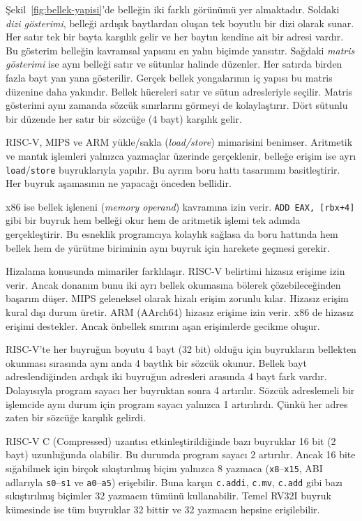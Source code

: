 Şekil~\ref{fig:bellek-yapisi}'de belleğin iki farklı görünümü yer almaktadır. Soldaki \emph{dizi gösterimi}, belleği ardışık baytlardan oluşan tek boyutlu bir dizi olarak sunar. Her satır tek bir bayta karşılık gelir ve her baytın kendine ait bir adresi vardır. Bu gösterim belleğin kavramsal yapısını en yalın biçimde yansıtır. Sağdaki \emph{matris gösterimi} ise aynı belleği satır ve sütunlar halinde düzenler. Her satırda birden fazla bayt yan yana gösterilir. Gerçek bellek yongalarının iç yapısı bu matris düzenine daha yakındır. Bellek hücreleri satır ve sütun adresleriyle seçilir. Matris gösterimi aynı zamanda sözcük sınırlarını görmeyi de kolaylaştırır. Dört sütunlu bir düzende her satır bir sözcüğe (4 bayt) karşılık gelir.

\begin{karsilastirma}
RISC-V, MIPS ve ARM yükle/sakla (\emph{load/store}) mimarisini benimser. Aritmetik ve mantık işlemleri yalnızca yazmaçlar üzerinde gerçeklenir, belleğe erişim ise ayrı \texttt{load}/\texttt{store} buyruklarıyla yapılır. Bu ayrım boru hattı tasarımını basitleştirir. Her buyruk aşamasının ne yapacağı önceden bellidir.

x86 ise bellek işleneni (\emph{memory operand}) kavramına izin verir. \texttt{ADD EAX, [rbx+4]} gibi bir buyruk hem belleği okur hem de aritmetik işlemi tek adımda gerçekleştirir. Bu esneklik programcıya kolaylık sağlasa da boru hattında hem bellek hem de yürütme biriminin aynı buyruk için harekete geçmesi gerekir.

Hizalama konusunda mimariler farklılaşır. RISC-V belirtimi hizasız erişime izin verir. Ancak donanım bunu iki ayrı bellek okumasına bölerek çözebileceğinden başarım düşer. MIPS geleneksel olarak hizalı erişim zorunlu kılar. Hizasız erişim kural dışı durum üretir. ARM (AArch64) hizasız erişime izin verir. x86 de hizasız erişimi destekler. Ancak önbellek sınırını aşan erişimlerde gecikme oluşur.
\end{karsilastirma}

RISC-V'te her buyruğun boyutu 4 bayt (32 bit) olduğu için buyrukların bellekten okunması sırasında aynı anda 4 baytlık bir sözcük okunur. Bellek bayt adreslendiğinden ardışık iki buyruğun adresleri arasında 4 bayt fark vardır. Dolayısıyla program sayacı her buyruktan sonra 4 artırılır. Sözcük adreslemeli bir işlemcide aynı durum için program sayacı yalnızca 1 artırılırdı. Çünkü her adres zaten bir sözcüğe karşılık gelirdi.

\begin{bilginot}
RISC-V C (Compressed) uzantısı etkinleştirildiğinde bazı buyruklar 16 bit (2 bayt) uzunluğunda olabilir. Bu durumda program sayacı 2 artırılır. Ancak 16 bite sığabilmek için birçok sıkıştırılmış biçim yalnızca 8 yazmaca (\texttt{x8}--\texttt{x15}, ABI adlarıyla \texttt{s0}--\texttt{s1} ve \texttt{a0}--\texttt{a5}) erişebilir. Buna karşın \texttt{c.addi}, \texttt{c.mv}, \texttt{c.add} gibi bazı sıkıştırılmış biçimler 32 yazmacın tümünü kullanabilir. Temel RV32I buyruk kümesinde ise tüm buyruklar 32 bittir ve 32 yazmacın hepsine erişilebilir.
\end{bilginot}

